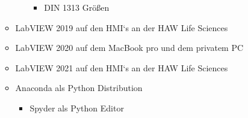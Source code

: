 \begin{itemize}
\begin{itemize}
\begin{itemize}
\begin{itemize}
		\item DIN 1313 Größen 
		\end{itemize}		
		\end{itemize}
	\item LabVIEW 2019 auf den HMI`s an der HAW Life Sciences	
	\item LabVIEW 2020 auf dem MacBook pro und dem privatem PC
	\item LabVIEW 2021 auf den HMI`s an der HAW Life Sciences
	\item Anaconda als Python Distribution
		\begin{itemize}
		\item Spyder als Python Editor
		\end{itemize}
\end{itemize}
\end{itemize}

